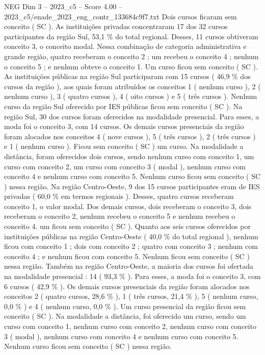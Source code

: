 \begin{textsample}{NEG Dim 3 – 2023\_c5 – Score 4.00 – 2023\_c5/enade\_2023\_eng\_contr\_133684c9f7.txt}
Dois cursos ficaram sem conceito ( SC ).
As instituições privadas concentraram 17 dos 32 cursos participantes da região Sul, 53,1 \% do total regional.
Desses, 11 cursos obtiveram conceito 3, o conceito modal.
Nessa combinação de categoria administrativa e grande região, quatro receberam o conceito 2 ; um recebeu o conceito 4 ; nenhum o conceito 5 ; e nenhum obteve o conceito 1.
Um curso ficou sem conceito ( SC ).
As instituições públicas na região Sul participaram com 15 cursos ( 46,9 \% dos cursos da região ), aos quais foram atribuídos os conceitos 1 ( nenhum curso ), 2 ( nenhum curso ), 3 ( quatro cursos ), 4 ( oito cursos ) e 5 ( três cursos ).
Nenhum curso da região Sul oferecido por IES públicas ficou sem conceito ( SC ).
Na região Sul, 30 dos cursos foram oferecidos na modalidade presencial.
Para esses, a moda foi o conceito 3, com 14 cursos.
Os demais cursos presenciais da região foram alocados nos conceitos 4 ( nove cursos ), 5 ( três cursos ), 2 ( três cursos ) e 1 ( nenhum curso ).
Ficou sem conceito ( SC ) um curso.
Na modalidade a distância, foram oferecidos dois cursos, sendo nenhum curso com conceito 1, um curso com conceito 2, um curso com conceito 3 ( modal ), nenhum curso com conceito 4 e nenhum curso com conceito 5.
Nenhum curso ficou sem conceito ( SC ) nessa região.
Na região Centro-Oeste, 9 dos 15 cursos participantes eram de IES privadas ( 60,0 \% em termos regionais ).
Desses, quatro cursos receberam conceito 1, o valor modal.
Dos demais cursos, dois receberam o conceito 3, dois receberam o conceito 2, nenhum recebeu o conceito 5 e nenhum recebeu o conceito 4. um ficou sem conceito ( SC ).
Quanto aos seis cursos oferecidos por instituições públicas na região Centro-Oeste ( 40,0 \% do total regional ), nenhum ficou com conceito 1 ; dois com conceito 2 ; quatro com conceito 3 ; nenhum com conceito 4 ; e nenhum ficou com conceito 5.
Nenhum ficou sem conceito ( SC ) nessa região.
Também na região Centro-Oeste, a maioria dos cursos foi ofertada na modalidade presencial : 14 ( 93,3 \% ).
Para esses, a moda foi o conceito 3, com 6 cursos ( 42,9 \% ).
Os demais cursos presenciais da região foram alocados nos conceitos 2 ( quatro cursos, 28,6 \% ), 1 ( três cursos, 21,4 \% ), 5 ( nenhum curso, 0,0 \% ) e 4 ( nenhum curso, 0,0 \% ).
Um curso presencial da região ficou sem conceito ( SC ).
Na modalidade a distância, foi oferecido um curso, sendo um curso com conceito 1, nenhum curso com conceito 2, nenhum curso com conceito 3 ( modal ), nenhum curso com conceito 4 e nenhum curso com conceito 5.
Nenhum curso ficou sem conceito ( SC ) nessa região.

\end{textsample}
